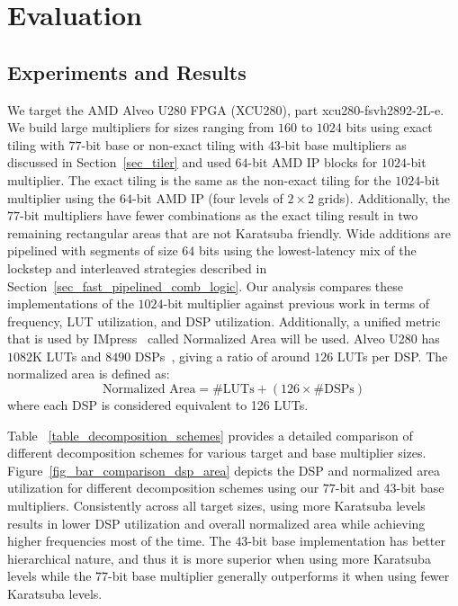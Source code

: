 \section{Evaluation}
\subsection{Experiments and Results}
We target the AMD Alveo U280 FPGA (XCU280), part xcu280-fsvh2892-2L-e. 
We build large multipliers for sizes ranging from $160$ to $1024$ bits using exact tiling with $77$-bit base or non-exact tiling with $43$-bit base multipliers as discussed in Section~\ref{sec_tiler} and used $64$-bit AMD IP blocks for $1024$-bit multiplier.
The exact tiling is the same as the non-exact tiling for the $1024$-bit multiplier using the $64$-bit AMD IP (four levels of $2\times2$ grids).
Additionally, the $77$-bit multipliers have fewer combinations as the exact tiling result in two remaining rectangular areas that are not Karatsuba friendly.
Wide additions are pipelined with segments of size $64$ bits using the lowest-latency mix of the lockstep and interleaved strategies described in Section~\ref{sec_fast_pipelined_comb_logic}.
Our analysis compares these implementations of the $1024$-bit multiplier against previous work in terms of frequency, LUT utilization, and DSP utilization.
Additionally, a unified metric that is used by IMpress~\cite{zhangIMpressLargeInteger2022} called Normalized Area will be used.
Alveo U280 has $1082$K LUTs and $8490$ DSPs~\cite{U280SwitchingCharacteristics}, giving a ratio of around $126$ LUTs per DSP. 
The normalized area is defined as:
\begin{equation*}
\text{Normalized Area} = \#\text{LUTs} + (126 \times \#\text{DSPs})
\end{equation*}
where each DSP is considered equivalent to 126 LUTs.

Table ~\ref{table_decomposition_schemes} provides a detailed comparison of different decomposition schemes for various target and base multiplier sizes. 
Figure~\ref{fig_bar_comparison_dsp_area} depicts the DSP and normalized area utilization for different decomposition schemes using our $77$-bit and $43$-bit base multipliers.
Consistently across all target sizes, using more Karatsuba levels results in lower DSP utilization and overall normalized area while achieving higher frequencies most of the time.
The $43$-bit base implementation has better hierarchical nature, and thus it is more superior when using more Karatsuba levels while the $77$-bit base multiplier generally outperforms it when using fewer Karatsuba levels.

